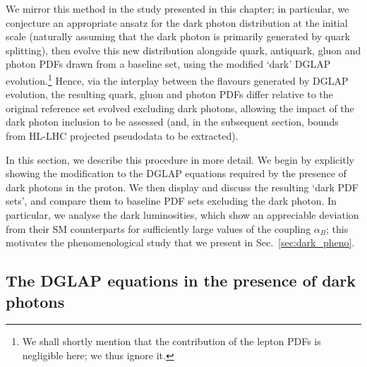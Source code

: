 \documentclass[withindex,glossary]{cam-thesis}
\begin{document}
We mirror this method in the study presented in this chapter; in particular, we conjecture
an appropriate ansatz for the dark photon distribution at the initial scale (naturally assuming that
the dark photon is primarily generated by quark splitting),
then evolve this new distribution alongside quark, antiquark,
gluon and photon PDFs drawn from a baseline set, using the modified `dark' DGLAP evolution.\footnote{We shall shortly mention that the contribution of the lepton PDFs is negligible here;
we thus ignore it.}
Hence, via the interplay between the flavours generated by
DGLAP evolution, the resulting quark, gluon and photon PDFs differ relative
to the original reference set evolved excluding dark photons, allowing the impact
of the dark photon inclusion to be assessed (and, in the subsequent section, bounds from HL-LHC
projected pseudodata to be extracted).

In this section, we describe this procedure in more detail.
We begin by explicitly showing the modification to the DGLAP equations
required by the presence of dark photons in the proton.
We then display and discuss the resulting `dark PDF sets',
and compare them to baseline PDF sets excluding the dark photon.
In particular, we analyse the dark luminosities, which show an appreciable deviation
from their SM counterparts for sufficiently large values of the coupling $\alpha_B$;
this motivates the phenomenological study that we present in Sec.~\ref{sec:dark_pheno}.


\subsection{The DGLAP equations in the presence of dark photons}
\label{subsec:dglap}

\end{document}
